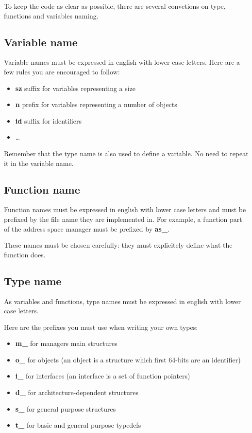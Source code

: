 To keep the code as clear as possible, there are several convetions on
type, functions and variables naming.

\subsection*{Variable name}

Variable  names   must  be  expressed  in  english   with  lower  case
letters. Here are a few rules you are encouraged to follow:

\begin{itemize}
\item \textbf{sz} suffix for variables representing a size
\item \textbf{n} prefix for variables representing a number of objects
\item \textbf{id} suffix for identifiers
\item \ldots
\end{itemize}

Remember that the type name is also used to define a variable. No need
to repeat it in the variable name.

\subsection*{Function name}

Function names  must be expressed  in english with lower  case letters
and must  be prefixed by  the file name  they are implemented  in. For
example, a function part of the address space manager must be prefixed
by \textbf{as\_}.

These  names must be  chosen carefully:  they must  explicitely define
what the function does.

\subsection*{Type name}

As variables  and functions, type  names must be expressed  in english
with lower case letters.

Here are the prefixes you must use when writing your own types:

\begin{itemize}
\item \textbf{m\_} for managers main structures
\item \textbf{o\_} for  objects (an object is a  structure which first
64-bits are an identifier)
\item \textbf{i\_} for interfaces (an interface is a set of function pointers)
\item \textbf{d\_} for architecture-dependent structures
\item \textbf{s\_} for general purpose structures
\item \textbf{t\_} for basic and general purpose typedefs
\end{itemize}

